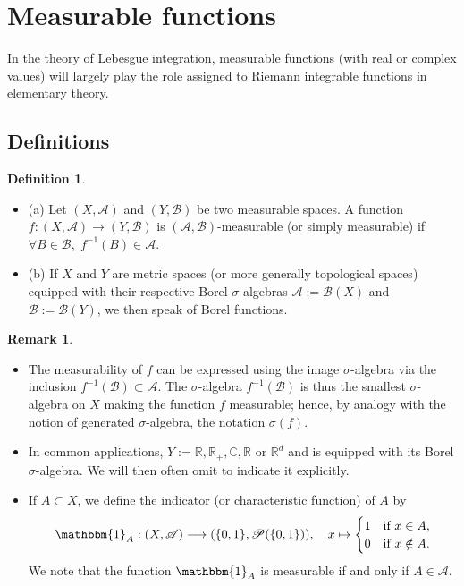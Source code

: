 \documentclass[12pt]{article}
\theoremstyle{definition}
\newtheorem{definition}{Definition}[section]
\newtheorem{remark}{Remark}[section]
\begin{document}
\newpage
\section{Measurable functions}
In the theory of Lebesgue integration, measurable functions (with real or complex values) will largely play the role assigned to Riemann integrable functions in elementary theory.
\subsection{Definitions}
\begin{definition}
\begin{itemize}
\item (a) Let $(X,\mathscr{A})$ and $(Y,\mathscr{B})$ be two measurable spaces. A function $f:(X,\mathscr{A}) \to (Y,\mathscr{B})$ is $(\mathscr{A},\mathscr{B})$-measurable (or simply measurable) if $\forall B \in \mathscr{B}, \; f^{-1}(B)\in\mathscr{A}$.

\item (b) If $X$ and $Y$ are metric spaces (or more generally topological spaces) equipped with their respective Borel $\sigma$-algebras $\mathscr{A}:=\mathscr{B}(X)$ and $\mathscr{B}:=\mathscr{B}(Y)$, we then speak of Borel functions.
\end{itemize}
\end{definition}

\begin{remark}
\begin{itemize}
    \item The measurability of $f$ can be expressed using the image $\sigma$-algebra via the inclusion $f^{-1}(\mathscr{B})\subset \mathscr{A}$. The $\sigma$-algebra $f^{-1}(\mathscr{B})$ is thus the smallest $\sigma$-algebra on $X$ making the function $f$ measurable; hence, by analogy with the notion of generated $\sigma$-algebra, the notation $\sigma(f)$.
    \item In common applications, $Y:=\mathbb{R}, \mathbb{R}_{+}, \mathbb{C}, \overline{\mathbb{R}}$ or $\mathbb{R}^d$ and is equipped with its Borel $\sigma$-algebra. We will then often omit to indicate it explicitly.
    \item If $A\subset X$, we define the indicator (or characteristic function) of $A$ by
    \[
    \mathbbm{1}_A:(X,\mathscr{A}) \longrightarrow (\{0,1\},\mathscr{P}(\{0,1\})),
    \quad x\mapsto
    \begin{cases}
    1 &\text{if } x\in A, \\
    0 &\text{if } x\notin A.
    \end{cases}
    \]
    We note that the function $\mathbbm{1}_A$ is measurable if and only if $A\in \mathscr{A}$.
\end{itemize}
\end{remark}
\end{document}
